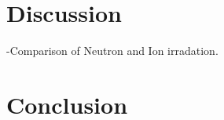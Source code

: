 \documentclass[a4paper]{article}
\begin{document}
%
%
%
%
\newpage
\section{Discussion} \hspace{10pt}
-Comparison of Neutron and Ion irradation.

\newpage
\section{Conclusion} \hspace{10pt}
\end{document}
